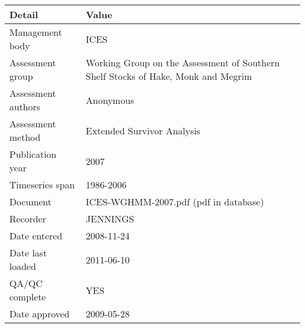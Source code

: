 \begin{table}[htb]
\centering
\begin{tabular}{lp{7cm}}
\toprule
Detail & Value \\
\midrule
Management body    & ICES                                                                              \\
Assessment group   & Working Group on the Assessment of Southern Shelf Stocks of Hake, Monk and Megrim \\
Assessment authors & Anonymous                                                                         \\
Assessment method  & Extended Survivor Analysis                                                        \\
Publication year   & 2007                                                                              \\
Timeseries span    & 1986-2006                                                                         \\
Document           & ICES-WGHMM-2007.pdf (pdf in database)                                             \\
Recorder           & JENNINGS                                                                          \\
Date entered       & 2008-11-24                                                                        \\
Date last loaded   & 2011-06-10                                                                        \\
QA/QC complete     & YES                                                                               \\
Date approved      & 2009-05-28                                                                        \\
\bottomrule
\end{tabular}
\label{tab:assessdet}
\end{table}

